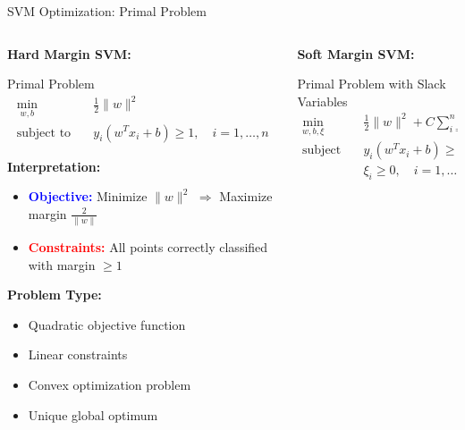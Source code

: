\documentclass[8pt,aspectratio=1610]{beamer}
\begin{document}
\begin{frame}{SVM Optimization: Primal Problem}
\begin{columns}[t]
\begin{column}{0.48\textwidth}
\textbf{Hard Margin SVM:}
\vspace{0.2cm}

\begin{block}{Primal Problem}
\begin{align}
\min_{w,b} \quad &\frac{1}{2}\|w\|^2 \\
\text{subject to} \quad &y_i(w^T x_i + b) \geq 1, \quad i = 1,\ldots,n
\end{align}
\end{block}

\vspace{0.3cm}
\textbf{Interpretation:}
\begin{itemize}
\setlength{\itemsep}{1pt}
\item \textcolor{blue}{\textbf{Objective:}} Minimize $\|w\|^2$ $\Rightarrow$ Maximize margin $\frac{2}{\|w\|}$
\item \textcolor{red}{\textbf{Constraints:}} All points correctly classified with margin $\geq 1$
\end{itemize}

\vspace{0.3cm}
\textbf{Problem Type:}
\begin{itemize}
\setlength{\itemsep}{1pt}
\item Quadratic objective function
\item Linear constraints
\item Convex optimization problem
\item Unique global optimum
\end{itemize}
\end{column}

\begin{column}{0.48\textwidth}
\textbf{Soft Margin SVM:}
\vspace{0.2cm}

\begin{block}{Primal Problem with Slack Variables}
\begin{align}
\min_{w,b,\xi} \quad &\frac{1}{2}\|w\|^2 + C\sum_{i=1}^{n}\xi_i \\
\text{subject to} \quad &y_i(w^T x_i + b) \geq 1 - \xi_i \\
&\xi_i \geq 0, \quad i = 1,\ldots,n
\end{align}
\end{block}


\end{column}
\end{columns}
\end{frame}
\end{document}
